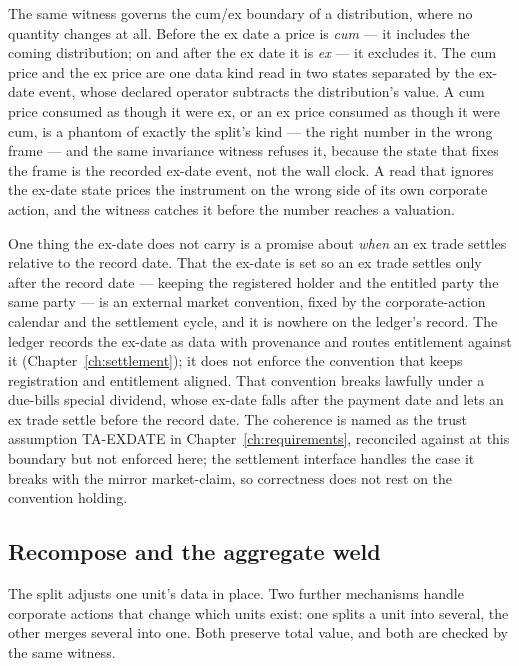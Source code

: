 \documentclass[11pt,a4paper]{article}
\begin{document}
The same witness governs the cum/ex boundary of a distribution, where no quantity changes
at all. Before the ex date a price is \emph{cum} --- it includes the coming distribution;
on and after the ex date it is \emph{ex} --- it excludes it. The cum price and the ex price
are one data kind read in two states separated by the ex-date event, whose declared
operator subtracts the distribution's value. A cum price consumed as though it were ex, or
an ex price consumed as though it were cum, is a phantom of exactly the split's kind ---
the right number in the wrong frame --- and the same invariance witness refuses it, because
the state that fixes the frame is the recorded ex-date event, not the wall clock. A read
that ignores the ex-date state prices the instrument on the wrong side of its own corporate
action, and the witness catches it before the number reaches a valuation.

One thing the ex-date does not carry is a promise about \emph{when} an ex trade settles
relative to the record date. That the ex-date is set so an ex trade settles only after the
record date --- keeping the registered holder and the entitled party the same party --- is
an external market convention, fixed by the corporate-action calendar and the settlement
cycle, and it is nowhere on the ledger's record. The ledger records the ex-date as data
with provenance and routes entitlement against it (Chapter~\ref{ch:settlement}); it does not
enforce the convention that keeps registration and entitlement aligned. That convention
breaks lawfully under a due-bills special dividend, whose ex-date falls after the payment
date and lets an ex trade settle before the record date. The coherence is named as the
trust assumption TA-EXDATE in Chapter~\ref{ch:requirements}, reconciled against at this
boundary but not enforced here; the settlement interface handles the case it breaks with the
mirror market-claim, so correctness does not rest on the convention holding.

\subsection{Recompose and the aggregate weld}\label{sec:recompose}

The split adjusts one unit's data in place. Two further mechanisms handle corporate actions
that change which units exist: one splits a unit into several, the other merges several into
one. Both preserve total value, and both are checked by the same witness.
\end{document}
